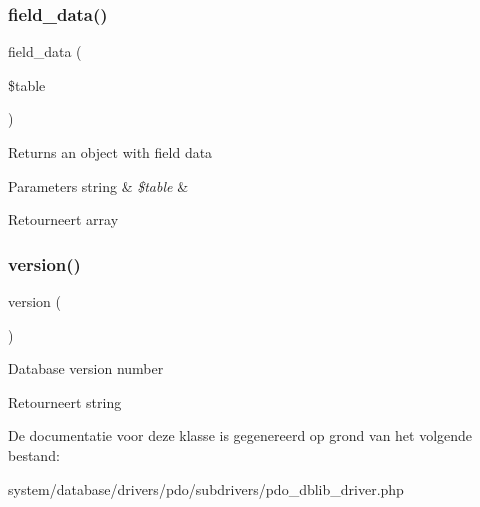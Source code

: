 \subsubsection{\texorpdfstring{field\_data()}{field\_data()}}
{\footnotesize\ttfamily field\+\_\+data (\begin{DoxyParamCaption}\item[{}]{\$table }\end{DoxyParamCaption})}

Returns an object with field data


\begin{DoxyParams}[1]{Parameters}
string & {\em \$table} & \\
\hline
\end{DoxyParams}
\begin{DoxyReturn}{Retourneert}
array 
\end{DoxyReturn}
\mbox{\label{class_c_i___d_b__pdo__dblib__driver_a6080dae0886626b9a4cedb29240708b1}} 
\subsubsection{\texorpdfstring{version()}{version()}}
{\footnotesize\ttfamily version (\begin{DoxyParamCaption}{ }\end{DoxyParamCaption})}

Database version number

\begin{DoxyReturn}{Retourneert}
string 
\end{DoxyReturn}


De documentatie voor deze klasse is gegenereerd op grond van het volgende bestand\+:\begin{DoxyCompactItemize}
\item 
system/database/drivers/pdo/subdrivers/pdo\+\_\+dblib\+\_\+driver.\+php\end{DoxyCompactItemize}
